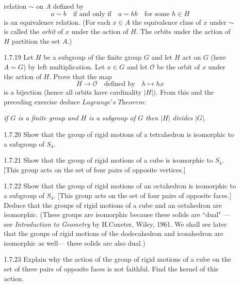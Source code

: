 \begin{enumerate}
                  relation $\sim$ on $A$ defined by
                  $$a \sim b \quad \text{if and only if} \quad
                    a = hb \quad \text{for some }h \in H$$
                  is an equivalence relation. (For each $x \in A$ the
                  equivalence class of $x$ under $\sim$ is called the
                  \textit{orbit} of $x$ under the action of $H$. The orbits
                  under the action of $H$ partition the set $A$.)
   \item[1.7.19]  Let $H$ be a subgroup of the finite group $G$ and let $H$ act
                  on $G$ (here $A = G$) by left multiplication. Let $x \in G$
                  and let $\mathcal{O}$ be the orbit of $x$ under the action of
                  $H$. Prove that the map
                  $$H \rightarrow \mathcal{O}\quad \text{defined by} \quad
                    h \mapsto hx$$
                  is a bijection (hence all orbits have cardinality $|H|$). From
                  this and the preceding exercise deduce
                  $\textit{Lagrange's Theorem}:$
                  \begin{center}
                     \textit{if $G$ is a finite group and $H$ is a subgroup of
                     $G$ then $|H|$ divides $|G|$}.
                  \end{center}
   \item[1.7.20]  Show that the group of rigid motions of a tetrahedron is
                  isomorphic to a subgroup of $S_4$.
   \item[1.7.21]  Show that the group of rigid motions of a cube is isomorphic
                  to $S_4$. [This group acts on the set of four pairs of
                  opposite vertices.]
   \item[1.7.22]  Show that the group of rigid motions of an octahedron is
                  isomorphic to a subgroup of $S_4$. [This group acts on the set
                  of four pairs of opposite faces.] Deduce that the groups of
                  rigid motions of a cube and an octahedron are isomorphic.
                  (These groups are isomorphic because these solids are ``dual"
                  ---see \textit{Introduction to Geometry} by H.Coxeter, Wiley,
                  1961. We shall see later that the groups of rigid motions of
                  the dodecahedron and icosahedron are isomorphic as well---
                  these solids are also dual.)
   \item[1.7.23]  Explain why the action of the group of rigid motions of a cube
                  on the set of three pairs of opposite faces is not faithful.
                  Find the kernel of this action.
\end{enumerate}
